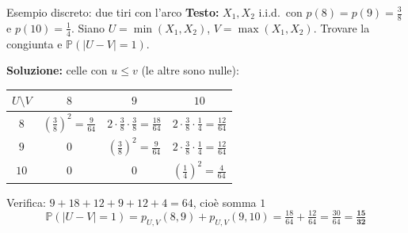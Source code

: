 \documentclass[12pt]{extarticle} %
\begin{document}
\begin{eserciziobox}{{Esempio discreto: due tiri con l'arco}}
\textbf{Testo:} $X_1, X_2$ i.i.d.\ con $p(8) = p(9) = \frac38$ e $p(10) = \frac14$. Siano $U = \min(X_1,X_2)$, $V = \max(X_1,X_2)$. Trovare la congiunta e $\mathbb{P}(|U-V| = 1)$.
\par\textbf{Soluzione:} celle con $u \le v$ (le altre sono nulle):
\begin{center}
\renewcommand{\arraystretch}{1.4}
\begin{tabular}{|c|c|c|c|}
\hline $U \setminus V$ & $8$ & $9$ & $10$ \\ \hline
$8$ & $\left(\frac38\right)^2 = \frac{9}{64}$ & $2\cdot\frac38\cdot\frac38 = \frac{18}{64}$ & $2\cdot\frac38\cdot\frac14 = \frac{12}{64}$ \\ \hline
$9$ & $0$ & $\left(\frac38\right)^2 = \frac{9}{64}$ & $2\cdot\frac38\cdot\frac14 = \frac{12}{64}$ \\ \hline
$10$ & $0$ & $0$ & $\left(\frac14\right)^2 = \frac{4}{64}$ \\ \hline
\end{tabular}
\end{center}
{\footnotesize Verifica: $9+18+12+9+12+4 = 64$, cioè somma $1$ \checkmark}
$$ \mathbb{P}(|U-V| = 1) = p_{U,V}(8,9) + p_{U,V}(9,10) = \tfrac{18}{64} + \tfrac{12}{64} = \tfrac{30}{64} = \mathbf{\tfrac{15}{32}} $$
\end{eserciziobox}
\end{document}
